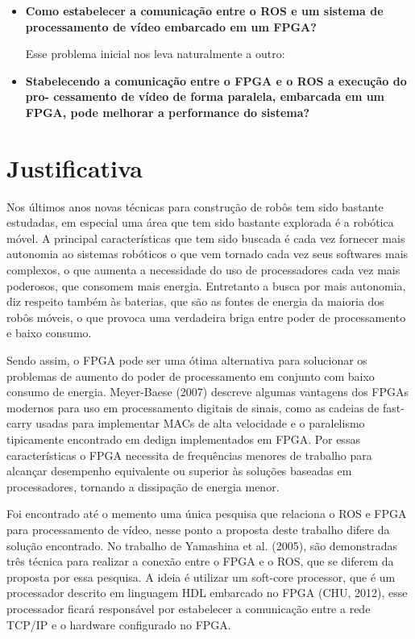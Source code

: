 \begin{itemize}
    \item \textbf{Como estabelecer a comunicação entre o ROS e um sistema de processamento de vídeo 
embarcado em um FPGA?}


Esse problema inicial nos leva naturalmente a outro:


    \item \textbf{Stabelecendo a comunicação entre o FPGA e o ROS a execução do pro-
cessamento de vídeo de forma paralela, embarcada em um FPGA, pode
melhorar a performance do sistema?}
  
\end{itemize}







\section{Justificativa}

Nos últimos anos novas técnicas para construção de robôs tem sido bastante estudadas, em 
especial uma área que tem sido bastante explorada é a robótica móvel. A principal 
características que tem sido buscada é cada vez fornecer mais autonomia ao sistemas 
robóticos o que vem tornado cada vez seus softwares mais complexos, o que aumenta a 
necessidade do uso de processadores cada vez mais poderosos, que consomem mais energia. 
Entretanto a busca por mais autonomia, diz respeito também às baterias, que são as fontes 
de energia da maioria dos robôs móveis, o que provoca uma verdadeira briga entre poder 
de processamento e baixo consumo.

Sendo assim, o FPGA pode ser uma ótima alternativa para solucionar os problemas de aumento 
do poder de processamento em conjunto com baixo consumo de energia. Meyer-Baese (2007) 
descreve algumas vantagens dos FPGAs modernos para uso em processamento digitais de 
sinais, como as cadeias de fast-carry usadas para implementar MACs de alta velocidade e o 
paralelismo tipicamente encontrado em dedign implementados em FPGA. Por essas 
características o FPGA necessita de frequências menores de trabalho para alcançar 
desempenho equivalente ou superior às soluções baseadas em processadores, tornando a 
dissipação de energia menor.

Foi encontrado até o memento uma única pesquisa que relaciona o ROS e FPGA para 
processamento de vídeo, nesse ponto a proposta deste trabalho difere da solução encontrado. 
No trabalho de Yamashina et al. (2005), são demonstradas três técnica para realizar a 
conexão entre o FPGA e o ROS, que se diferem da proposta por essa pesquisa. A ideia é 
utilizar um soft-core processor, que é um processador descrito em linguagem HDL embarcado 
no FPGA (CHU, 2012), esse processador ficará responsável por estabelecer a comunicação entre 
a rede TCP/IP e o hardware configurado no FPGA.

